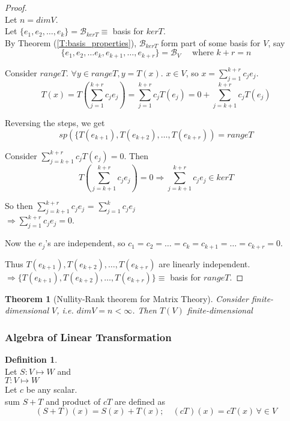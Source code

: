 \documentclass[twoside]{amsart}
\theoremstyle{plain}
\newtheorem{theorem}{Theorem}
\theoremstyle{definition}
\newtheorem{definition}{Definition}
\begin{document}
\begin{proof} \quad \\
Let $n=dim V$.  \\
Let $\{ e_1, e_2, \dots , e_k \}  = \mathcal{B}_{ker T} \equiv $ basis for $ker T$.  \\

By Theorem (\ref{T:basis_properties}), $\mathcal{B}_{ker T}$ form part of some basis for $V$, say 
\[
\{ e_1, e_2, \dots e_k, e_{k+1}, \dots , e_{k+r} \} = \mathcal{B}_V \quad \text{ where } k + r = n 
\]

Consider $range T$.  $\forall y \in range T, y = T(x)$.  $x\in V$, so $x = \sum_{j=1}^{k+r} c_j e_j$.  
\[
T(x) = T \left( \sum_{j=1}^{k+r} c_j e_j \right) = \sum_{j=1}^{k+r} c_j T(e_j) = 0 + \sum_{j=k+1}^{k+r} c_j T(e_j)
\]
 
Reversing the steps, we get
\[
sp(\{ T(e_{k+1}) , T(e_{k+2}) , \dots , T(e_{k+r}) ) = range T
\]

Consider $\sum_{j=k+1}^{k+r} c_j T(e_j) = 0$.  Then
\[
T\left( \sum_{j=k+1}^{k+r} c_j e_j \right) = 0 \Longrightarrow \sum_{j=k+1}^{k+r} c_j e_j \in ker T
\]

So then $\sum_{j=k+1}^{k+r} c_j e_j$ = $\sum_{j=1}^{k} c_j e_j$ \\
$\Longrightarrow \sum_{j=1}^{k+r} c_j e_j = 0$.  

Now the $e_j$'s are independent, so $c_1 = c_2 = \dots = c_k = c_{k+1} = \dots = c_{k+r} = 0 $.  

Thus $T(e_{k+1}), T(e_{k+2}), \dots , T(e_{k+r})$ are linearly independent.  \\
$\Longrightarrow \{ T(e_{k+1}), T(e_{k+2}), \dots , T(e_{k+r}) \} \equiv $ basis for $range T$.  
\end{proof}

\begin{theorem}[Nullity-Rank theorem for Matrix Theory]\label{T:Nullity-Rank_Theorem_Matrices}
Consider finite-dimensional $V$, i.e. $dim V = n < \infty$.  Then $T(V)$ finite-dimensional
\end{theorem}

\subsubsection{ Algebra of Linear Transformation }\label{subsubS:Algebra_of_Linear_Transformations}
\begin{definition}\label{D:sum_and_product_of_Linear_Transformations} \quad \\
Let $S:V \mapsto W$ and \\
\phantom{Let} $T: V \mapsto W$ \\
Let $c$ be any scalar.  \\
\phantom{Let} sum $S+T$ and product of $cT$ are defined as 
\begin{equation}\label{E:sum_and_product_of_Linear_Transformations}
  (S+T)(x) = S(x) + T(x); \quad (cT)(x) = cT(x) \, \forall \in V
\end{equation}
\end{definition}
\end{document}
